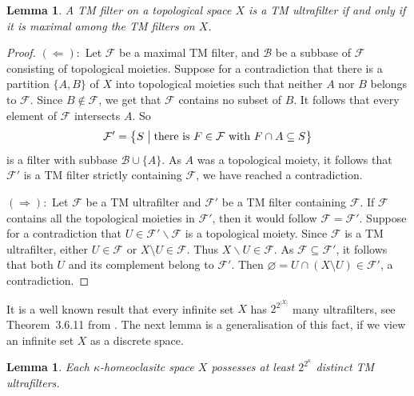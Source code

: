 \documentclass[11pt]{amsart}
\makeatletter
\newtheorem{lemma}[theorem]{Lemma}
\theoremstyle{definition}
\newcommand{\F}{\mathcal F}
\newcommand{\makeset}[2]{\left\lbrace #1 \;\middle|\;
 \begin{tabular}{@{}l@{}}
   #2
  \end{tabular}
  \right\rbrace}
\makeatother
\begin{document}
\begin{lemma}\label{lem:maximalultrafilters}
    A TM filter on a topological space \(X\) is a TM ultrafilter if and only if it is maximal among the TM filters on \(X\).
\end{lemma}
\begin{proof}
\((\Leftarrow):\) Let \(\mathcal{F}\) be a maximal TM filter, and $\mathcal B$ be a subbase of $\F$ consisting of topological moieties.
Suppose for a contradiction that there is a partition \(\{A,B\}\) of \(X\) into topological moieties such that neither \(A\) nor \(B\) belongs to \(\mathcal{F}\). Since $B\notin \F$, we get that \(\mathcal{F}\) contains no subset of \(B\). 
It follows that every element of \(\mathcal{F}\) intersects \(A\).
So \[\mathcal{F}'=\makeset{S}{there is $F\in \mathcal{F}$ with \(F\cap A \subseteq S\)}\] is a filter with subbase \(\mathcal{B}\cup \{A\}\). As \(A\) was a topological moiety, it follows that \(\mathcal{F}'\) is a TM filter strictly containing \(\mathcal{F}\), we have reached a contradiction.

\((\Rightarrow):\) Let \(\mathcal{F}\) be a TM ultrafilter and \(\mathcal{F}'\) be a TM filter containing \(\mathcal{F}\). 
If \(\mathcal{F}\) contains all the topological moieties in \(\mathcal{F}'\), then it would follow \(\mathcal{F}=\mathcal{F}'\).
Suppose for a contradiction that \(U\in \mathcal{F}' \backslash \mathcal{F}\) is a topological moiety. Since $\F$ is a TM ultrafilter, either \(U\in \mathcal{F}\) or \(X\setminus U\in \mathcal{F}\). Thus \(X\backslash U\in \mathcal{F}\). As \(\mathcal{F} \subseteq \mathcal{F}'\), it follows that both \(U\) and its complement belong to \(\mathcal{F}'\). Then \(\varnothing=U\cap (X\setminus U)\in \mathcal{F}'\), a contradiction.
\end{proof}

It is a well known result that every infinite set $X$ has $2^{2^{|X|}}$ many ultrafilters, see Theorem~3.6.11 from \cite{Eng}. The next lemma is a generalisation of this fact, if we view an infinite set $X$ as a discrete space.


\begin{lemma}\label{2chomeoclast}
Each \(\kappa\)-homeoclasitc space \(X\) possesses at least  $2^{2^{\kappa}}$ distinct TM ultrafilters.   
\end{lemma}
\end{document}
